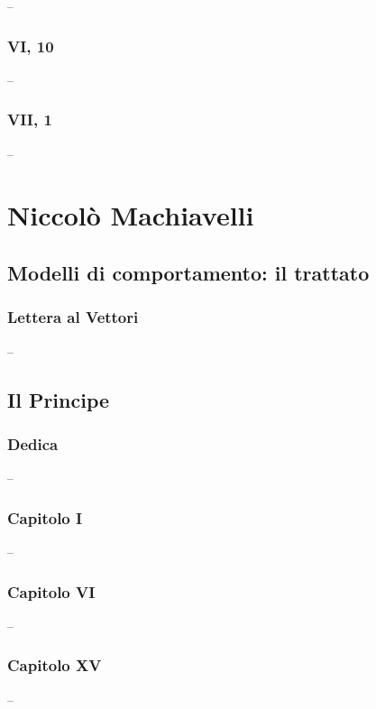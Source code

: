 \documentclass{article}
\begin{document}
--

\newpage
\subsubsection{VI, 10}

--

\newpage
\subsubsection{VII, 1}

--

\newpage
\section{Niccolò Machiavelli}
\subsection{Modelli di comportamento: il trattato}
\subsubsection{Lettera al Vettori}

--

\newpage
\subsection{Il Principe}
\subsubsection{Dedica}

--

\newpage
\subsubsection{Capitolo I}

--

\newpage
\subsubsection{Capitolo VI}

--

\newpage
\subsubsection{Capitolo XV}

--

\newpage
\end{document}
